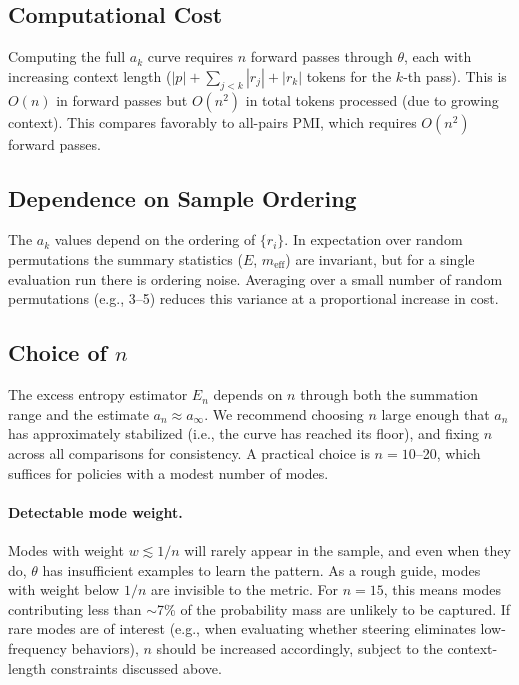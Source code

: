 \documentclass[11pt]{article}
\begin{document}
\subsection{Computational Cost}

Computing the full $a_k$ curve requires $n$ forward passes through $\theta$, each with increasing context length ($|p| + \sum_{j<k}|r_j| + |r_k|$ tokens for the $k$-th pass). This is $O(n)$ in forward passes but $O(n^2)$ in total tokens processed (due to growing context). This compares favorably to all-pairs PMI, which requires $O(n^2)$ forward passes.

\subsection{Dependence on Sample Ordering}

The $a_k$ values depend on the ordering of $\{r_i\}$. In expectation over random permutations the summary statistics ($E$, $m_{\mathrm{eff}}$) are invariant, but for a single evaluation run there is ordering noise. Averaging over a small number of random permutations (e.g., 3--5) reduces this variance at a proportional increase in cost.

\subsection{Choice of $n$}

The excess entropy estimator $\hat{E}_n$ depends on $n$ through both the summation range and the estimate $a_n \approx a_\infty$. We recommend choosing $n$ large enough that $a_n$ has approximately stabilized (i.e., the curve has reached its floor), and fixing $n$ across all comparisons for consistency. A practical choice is $n = 10$--20, which suffices for policies with a modest number of modes.

\paragraph{Detectable mode weight.} Modes with weight $w \lesssim 1/n$ will rarely appear in the sample, and even when they do, $\theta$ has insufficient examples to learn the pattern. As a rough guide, modes with weight below $1/n$ are invisible to the metric. For $n = 15$, this means modes contributing less than $\sim$7\% of the probability mass are unlikely to be captured. If rare modes are of interest (e.g., when evaluating whether steering eliminates low-frequency behaviors), $n$ should be increased accordingly, subject to the context-length constraints discussed above.
\end{document}
